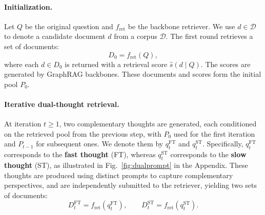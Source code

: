 \documentclass{article} %
\begin{document}
\paragraph{Initialization.}
Let $Q$ be the original question and $f_{\text{ret}}$ be the backbone retriever. We use $d \in \mathcal{D}$ to denote a candidate document $d$ from a corpus $\mathcal{D}$.  
The first round retrieves a set of documents:
\begin{equation}
D_0 = f_{\text{ret}}(Q),  
\label{eq:init}
\end{equation}
where each $d \in D_0$ is returned with a retrieval score $\hat{s}(d \mid Q)$.  The scores are generated by GraphRAG backbones.
These documents and scores form the initial pool $P_0$.


\paragraph{Iterative dual-thought retrieval.}
At iteration $t \geq 1$, two complementary thoughts are generated, each conditioned on the retrieved pool from the previous step, with $P_0$ used for the first iteration and $P_{t-1}$ for subsequent ones. We denote them by $q_t^{\text{FT}}$ and $q_t^{\text{ST}}$. Specifically, $q_t^{\text{FT}}$ corresponds to the \textbf{fast thought} (FT), whereas $q_t^{\text{ST}}$ corresponds to the \textbf{slow thought} (ST), as illustrated in Fig.~\ref{fig:dualprompt} in the Appendix. These thoughts are produced using distinct prompts to capture complementary perspectives, and are independently submitted to the retriever, yielding two sets of documents: 
\begin{equation}
D_t^{\text{FT}} = f_{\text{ret}}(q_t^{\text{FT}}), 
\qquad
D_t^{\text{ST}} = f_{\text{ret}}(q_t^{\text{ST}}).
\label{eq:dual}
\end{equation}
\end{document}
